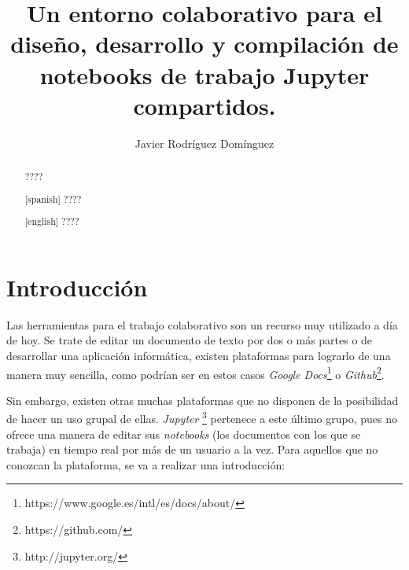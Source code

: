 \documentclass[11pt,spanish,listoffigures]{tfgetsinf}
\title{Un entorno colaborativo para el diseño, desarrollo y compilación de notebooks de trabajo Jupyter compartidos. }
\author{Javier Rodríguez Domínguez}
\begin{document}

\begin{abstract}
????
\end{abstract}
\begin{abstract}[spanish]
????
\end{abstract}
\begin{abstract}[english]
????
\end{abstract}


\mainmatter





\chapter{Introducci\'on}
\label{ch:intro}

Las herramientas para el trabajo colaborativo son un recurso muy utilizado a día de hoy. Se trate de editar un documento de texto por dos o más partes o de desarrollar una aplicación informática, existen plataformas para lograrlo de una manera muy sencilla, como podrían ser en estos casos \textit{Google Docs}\footnote{https://www.google.es/intl/es/docs/about/} o \textit{Github}\footnote{https://github.com/}. 

Sin embargo, existen otras muchas plataformas que no disponen de la posibilidad de hacer un uso grupal de ellas. \textit{Jupyter} \footnote{http://jupyter.org/} pertenece a este último grupo, pues no ofrece una manera de editar sus \textit{\gls{notebook}s} (los documentos con los que se trabaja) en tiempo real por más de un usuario a la vez. Para aquellos que no conozcan la plataforma, se va a realizar una introducción:
\end{document}

